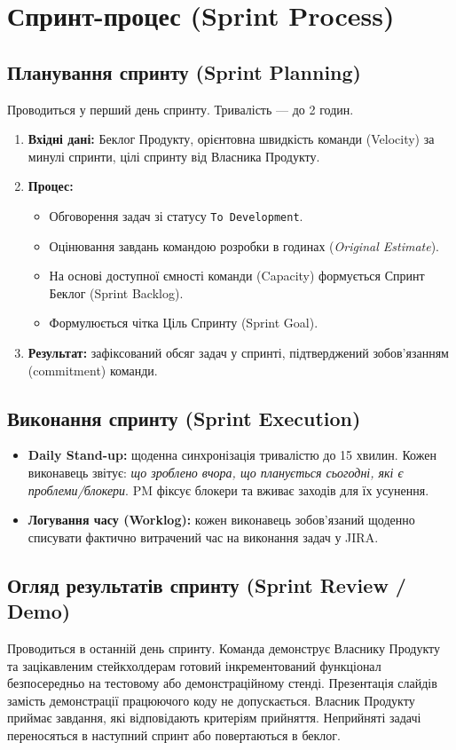 \documentclass{article}
\begin{document}
\section{Спринт-процес (Sprint Process)}

\subsection{Планування спринту (Sprint Planning)}
Проводиться у перший день спринту. Тривалість --- до 2 годин.
\begin{enumerate}
    \item \textbf{Вхідні дані:} Беклог Продукту, орієнтовна швидкість команди (Velocity) за минулі спринти, цілі спринту від Власника Продукту.
    \item \textbf{Процес:}
    \begin{itemize}
        \item Обговорення задач зі статусу \texttt{To Development}.
        \item Оцінювання завдань командою розробки в годинах (\emph{Original Estimate}).
        \item На основі доступної ємності команди (Capacity) формується Спринт Беклог (Sprint Backlog).
        \item Формулюється чітка Ціль Спринту (Sprint Goal).
    \end{itemize}
    \item \textbf{Результат:} зафіксований обсяг задач у спринті, підтверджений зобов'язанням (commitment) команди.
\end{enumerate}

\subsection{Виконання спринту (Sprint Execution)}
\begin{itemize}
    \item \textbf{Daily Stand-up:} щоденна синхронізація тривалістю до 15 хвилин. Кожен виконавець звітує: \emph{що зроблено вчора, що планується сьогодні, які є проблеми/блокери}. PM фіксує блокери та вживає заходів для їх усунення.
    \item \textbf{Логування часу (Worklog):} кожен виконавець зобов'язаний щоденно списувати фактично витрачений час на виконання задач у JIRA.
\end{itemize}

\subsection{Огляд результатів спринту (Sprint Review / Demo)}
Проводиться в останній день спринту. Команда демонструє Власнику Продукту та зацікавленим стейкхолдерам готовий інкрементований функціонал безпосередньо на тестовому або демонстраційному стенді. Презентація слайдів замість демонстрації працюючого коду не допускається. Власник Продукту приймає завдання, які відповідають критеріям прийняття. Неприйняті задачі переносяться в наступний спринт або повертаються в беклог.
\end{document}
